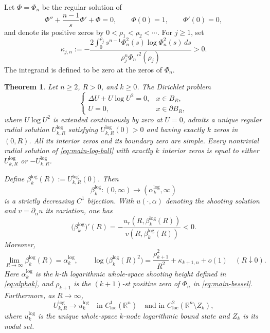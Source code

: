 \documentclass[11pt]{article}
\newtheorem{theorem}{Theorem}[section]
\begin{document}
Let $\Phi=\Phi_n$ be the regular solution of
\begin{equation}\label{eq:main-bessel}
\Phi''+\frac{n-1}{s}\Phi'+\Phi=0,
\qquad \Phi(0)=1,
\qquad \Phi'(0)=0,
\end{equation}
and denote its positive zeros by
$
0<\rho_1<\rho_2<\cdots.
$
For $j\ge1$, set
\begin{equation}\label{eq:main-log-kappa}
 \kappa_{j,n}:=
 -\frac{2\displaystyle\int_0^{\rho_j}
 s^{n-1}\Phi_n^2(s)\log\Phi_n^2(s)\,ds}
 {\rho_j^n\Phi_n'^2(\rho_j)}>0.
\end{equation}
The integrand is defined to be zero at the zeros of $\Phi_n$.

\begin{theorem}\label{thm:log-main}
Let $n\ge2$, $R>0$, and $k\ge0$. The Dirichlet problem
\begin{equation}\label{eq:main-log-ball}
 \begin{cases}
 \Delta U+U\log U^2=0,&x\in B_R,\\
 U=0,&x\in\partial B_R,
 \end{cases}
\end{equation}
where $U\log U^2$ is extended continuously by zero at $U=0$, admits a
unique regular radial solution $U^{\log}_{k,R}$ satisfying
$U^{\log}_{k,R}(0)>0$ and having exactly $k$ zeros in $(0,R)$. All its
interior zeros and its boundary zero are simple. Every nontrivial radial
solution of \eqref{eq:main-log-ball} with exactly $k$ interior zeros is equal
to either $U^{\log}_{k,R}$ or $-U^{\log}_{k,R}$.

Define $\beta_k^{\log}(R):=U^{\log}_{k,R}(0)$. Then
\[
 \beta_k^{\log}:(0,\infty)\longrightarrow
 (\alpha_k^{\log},\infty)
\]
is a {strictly decreasing $C^1$ bijection}. With
$u(\cdot,\alpha)$ denoting the shooting solution and
$v=\partial_\alpha u$ its variation, one has
\begin{equation*}
 \bigl(\beta_k^{\log}\bigr)'(R)
 =-\frac{u_r(R,\beta_k^{\log}(R))}
 {v(R,\beta_k^{\log}(R))}<0.
\end{equation*}
Moreover,
\begin{equation}\label{eq:main-log-limits}
 \lim_{R\to\infty}\beta_k^{\log}(R)=\alpha_k^{\log},
 \qquad
 \log\bigl(\beta_k^{\log}(R)^2\bigr)
 =\frac{\rho_{k+1}^2}{R^2}+\kappa_{k+1,n}+o(1)
 \quad(R\downarrow0).
\end{equation}
Here $\alpha_k^{\log}$ is the $k$-th logarithmic whole-space shooting
height defined in \eqref{eq:alphak}, and $\rho_{k+1}$ is the
$(k+1)$-st positive zero of $\Phi_n$ in \eqref{eq:main-bessel}.
Furthermore, as $R\to\infty$,
\begin{equation}\label{eq:main-log-convergence}
 U^{\log}_{k,R}\longrightarrow u_k^{\log}
 \quad\text{in }C^1_{\mathrm{loc}}(\mathbb R^n)
 \quad\text{and in }C^2_{\mathrm{loc}}(\mathbb R^n\setminus Z_k),
\end{equation}
where $u_k^{\log}$ is the unique whole-space $k$-node logarithmic bound
state and $Z_k$ is its nodal set.
\end{theorem}
\end{document}
